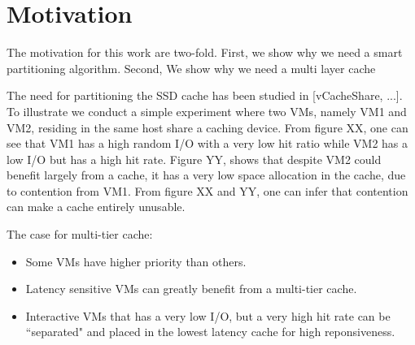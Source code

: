 
\section{Motivation}
The motivation for this work are two-fold. First, we show why we need a smart partitioning algorithm. Second, We show why we need a multi layer cache

The need for partitioning the SSD cache has been studied in [vCacheShare, ...]. To illustrate we conduct a simple experiment where two VMs, namely VM1 and VM2, residing in the same host share a caching device. From figure XX, one can see that VM1 has a high random I/O with a very low hit ratio while VM2 has a low I/O but has a high hit rate. Figure YY, shows that despite VM2 could benefit largely from a cache, it has a very low space allocation in the cache, due to contention from VM1. From figure XX and YY, one can infer that contention can make a cache entirely unusable.

The case for multi-tier cache:
\begin{itemize}
\item Some VMs have higher priority than others.
\item Latency sensitive VMs can greatly benefit from a multi-tier cache.
\item Interactive VMs that has a very low I/O, but a very high hit rate can be ``separated" and placed in the lowest latency cache for high reponsiveness.
\end{itemize}
